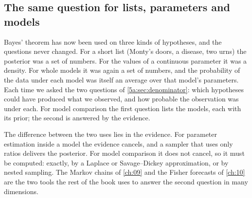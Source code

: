 \subsection{The same question for lists, parameters and models}
\label{5c:sec:same-question}

Bayes' theorem has now been used on three kinds of hypotheses, and the questions never
changed. For a short list (Monty's doors, a disease, two urns) the posterior was a set
of numbers. For the values of a continuous parameter it was a density. For whole models
it was again a set of numbers, and the probability of the data under each model was
itself an average over that model's parameters. Each time we asked the two questions of
\cref{5a:sec:denominator}: which hypotheses could have produced what we observed, and
how probable the observation was under each. For model comparison the first question
lists the models, each with its prior; the second is answered by the evidence.

The difference between the two uses lies in the evidence. For parameter estimation
inside a model the evidence cancels, and a sampler that uses only ratios delivers the
posterior. For model comparison it does not cancel, so it must be computed: exactly, by
a Laplace or Savage--Dickey approximation, or by nested sampling. The Markov chains of
\cref{ch:09} and the Fisher forecasts of \cref{ch:10} are the two tools the rest of the
book uses to answer the second question in many dimensions.

